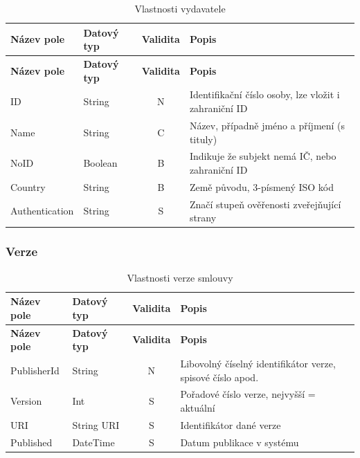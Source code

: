 \begin{center}
\begin{longtable}{lp{20mm}cp{65mm}}
\label{grid_mlmmh} \\
\multicolumn{1}{l}{\textbf{Název pole}} & 
\multicolumn{1}{l}{\textbf{Datový typ}} & 
\multicolumn{1}{l}{\textbf{Validita}} & 
\multicolumn{1}{l}{\textbf{Popis}} \\ \hline 
\endfirsthead
\multicolumn{1}{l}{\textbf{Název pole}} & 
\multicolumn{1}{l}{\textbf{Datový typ}} & 
\multicolumn{1}{l}{\textbf{Validita}} & 
\multicolumn{1}{l}{\textbf{Popis}} \\ \hline 
\hline
\endhead
\endfoot
\caption{Vlastnosti vydavatele}
\endlastfoot
ID & String & N & Identifikační číslo osoby, lze vložit i zahraniční ID \\
\rowcolor{validateC}Name & String & C & Název, případně jméno a příjmení (s tituly) \\
\rowcolor{validateB}NoID & Boolean & B & Indikuje že subjekt nemá IČ, nebo zahraniční ID \\
\rowcolor{validateB}Country & String & B & Země původu, 3-písmený ISO kód \\
\rowcolor{validateS}Authentication & String & S & Značí stupeň ověřenosti zveřejňující strany \\
\end{longtable}
\end{center}

\newpage

\subsubsection*{Verze}

\begin{center}
\begin{longtable}{lp{20mm}cp{65mm}}
\label{grid_mlmmh} \\
\multicolumn{1}{l}{\textbf{Název pole}} & 
\multicolumn{1}{l}{\textbf{Datový typ}} & 
\multicolumn{1}{l}{\textbf{Validita}} & 
\multicolumn{1}{l}{\textbf{Popis}} \\ \hline 
\endfirsthead
\multicolumn{1}{l}{\textbf{Název pole}} & 
\multicolumn{1}{l}{\textbf{Datový typ}} & 
\multicolumn{1}{l}{\textbf{Validita}} & 
\multicolumn{1}{l}{\textbf{Popis}} \\ \hline 
\hline
\endhead
\endfoot
\caption{Vlastnosti verze smlouvy}
\endlastfoot
PublisherId & String & N & Libovolný číselný identifikátor verze, spisové číslo apod. \\
\rowcolor{validateS}Version & Int & S & Pořadové číslo verze, nejvyšší = aktuální \\
\rowcolor{validateS}URI & String URI & S & Identifikátor dané verze \\
\rowcolor{validateS}Published & DateTime & S & Datum publikace v systému \\
\end{longtable}
\end{center}

